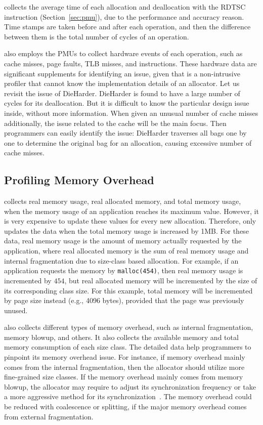 \MP{} collects the average time of each allocation and deallocation with the RDTSC instruction (Section~\ref{sec:pmu}), due to the performance and accuracy reason. Time stamps are taken before and after each operation, and then the difference between them is  the total number of cycles of an operation. 

\MP{} also employs the PMUs to collect hardware events of each operation, such as cache misses, page faults, TLB misses, and instructions. These hardware data are  significant supplements for identifying an issue, given that \MP{} is a non-intrusive profiler that cannot know the implementation details of an allocator. Let us revisit the issue of DieHarder. DieHarder is found to have a large number of cycles for its deallocation. But it is difficult to know the particular design issue inside, without more information. When given an unusual number of cache misses additionally, the issue related to the cache will be the main focus. Then programmers can easily identify the issue: DieHarder traverses all bags one by one to determine the original bag for an allocation, causing excessive number of cache misses. 

  
\subsection{Profiling Memory Overhead}
\label{sec:profilingmemory}

\MP{} collects real memory usage, real allocated memory, and total memory usage, when the memory usage of an application reaches its maximum value. However, it is very expensive to update these values for every new allocation. Therefore, \MP{} only updates the data when the total memory usage is increased by 1MB. For these data, real memory usage is the amount of memory actually requested by the application, where real allocated memory is the sum of real memory usage and internal fragmentation due to size-class based allocation. For example, if an application requests the memory by \texttt{malloc(454)}, then real memory usage is incremented by $454$, but real allocated memory will be incremented by the size of its corresponding class size. For this example, total memory will be incremented by page size instead (e.g., 4096 bytes), provided that the page was previously unused. 

\MP{} also collects different types of memory overhead, such as internal fragmentation, memory blowup, and others. It also collects the available memory and total memory consumption of each size class. The detailed data help programmers to pinpoint its memory overhead issue. For instance, if memory overhead mainly comes from the internal fragmentation, then the allocator should utilize more fine-grained size classes. If the memory overhead mainly comes from memory blowup, the allocator may require to adjust its synchronization frequency or take a more aggressive method for its synchronization~\citep{DBLP:conf/iwmm/LiLD19}. The memory overhead could be reduced with coalescence or splitting, if the major memory overhead comes from external fragmentation. 

